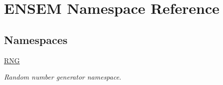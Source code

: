 \hypertarget{namespaceENSEM}{}\section{E\+N\+S\+EM Namespace Reference}
\label{namespaceENSEM}
\subsection*{Namespaces}
\begin{DoxyCompactItemize}
\item 
 \mbox{\hyperlink{namespaceENSEM_1_1RNG}{R\+NG}}
\begin{DoxyCompactList}\small\item\em Random number generator namespace. \end{DoxyCompactList}\end{DoxyCompactItemize}
